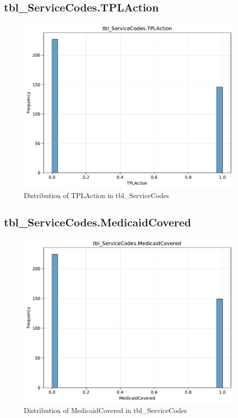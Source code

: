 \subsection{tbl\_ServiceCodes.TPLAction}

\begin{figure}[htbp]
\centering
\includegraphics[width=\textwidth]{figures/dbo_tbl_ServiceCodes_TPLAction.pdf}
\caption{Distribution of TPLAction in tbl\_ServiceCodes}
\end{figure}\newpage

\subsection{tbl\_ServiceCodes.MedicaidCovered}

\begin{figure}[htbp]
\centering
\includegraphics[width=\textwidth]{figures/dbo_tbl_ServiceCodes_MedicaidCovered.pdf}
\caption{Distribution of MedicaidCovered in tbl\_ServiceCodes}
\end{figure}\newpage

